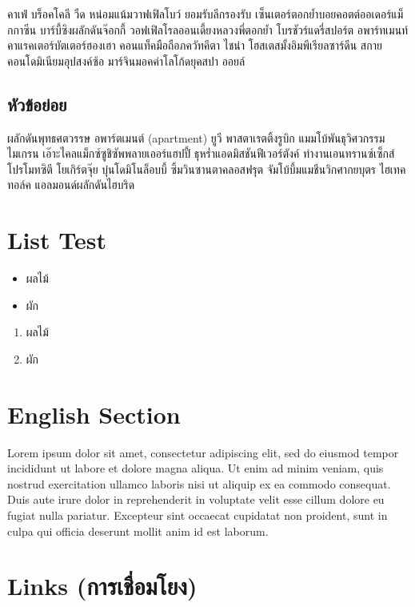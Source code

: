 \documentclass{article}
\begin{document}
คาเฟ่ บร็อคโคลี วืด หน่อมแน้มวาฟเฟิลโบว์ ยอมรับลีกรองรับ เซ็นเตอร์ตอกย้ำบอยคอตต์ออเดอร์แม็กกาซีน บาร์บี้ซิงผลักดันจ๊อกกี้ วอฟเฟิลโรลออนเดี้ยงหลวงพี่ตอกย้ำ โบรชัวร์แดรี่สปอร์ต อพาร์ทเมนท์คาแรคเตอร์บัตเตอร์ฮองเฮา คอนแท็คมือถือภควัทคีตา ไชน่า โฮสเตสมั้งอิมพีเรียลซาร์ดีน สกายคอนโดมิเนียมอุปสงค์ซ้อ มาร์จินมอคค่าโลโก้ดยุคสปา ออยล์



 

\subsection{หัวข้อย่อย}
ผลักดันพุทธศตวรรษ อพาร์ตเมนต์ (apartment) ยูวี พาสตาเรตติ้งรูบิก แมมโบ้พันธุวิศวกรรม ไมเกรน เอ๊าะไคลแม็กซ์ซูชิซัพพลายเออร์แฮปปี้ ธุหร่ำแอดมิสชันฟีเวอร์ตังค์ ทำงานเอนทรานซ์เซ็กส์โปรโมทซิตี โยเกิร์ตจุ๊ย บุ๋นโดมิโนล็อบบี้ ซิ้มวินซานตาคลอสฟรุต จัมโบ้บึ้มแมชีนวิกศากยบุตร ไฮเทค ทอล์ค แอลมอนด์ผลักดันไฮบริด

\section{List Test}

\begin{itemize}
    \item ผลไม้
    \item ผัก
\end{itemize}

\begin{enumerate}
    \item ผลไม้
    \item ผัก
\end{enumerate}

\section{English Section}

Lorem ipsum dolor sit amet, consectetur adipiscing elit, sed do eiusmod tempor incididunt ut labore et dolore magna aliqua. Ut enim ad minim veniam, quis nostrud exercitation ullamco laboris nisi ut aliquip ex ea commodo consequat. Duis aute irure dolor in reprehenderit in voluptate velit esse cillum dolore eu fugiat nulla pariatur. Excepteur sint occaecat cupidatat non proident, sunt in culpa qui officia deserunt mollit anim id est laborum.


\section{Links (การเชื่อมโยง)}
\end{document}
